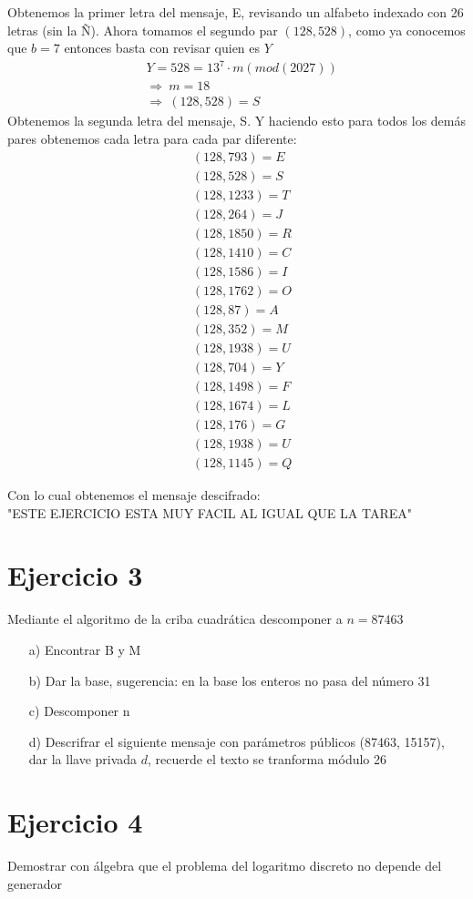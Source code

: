 \documentclass[12pt, letterpaper]{article}
\begin{document}
\begin{itemize}
Obtenemos la primer letra del mensaje, E, revisando un alfabeto indexado con 26 letras (sin la Ñ). Ahora tomamos el segundo par $(128, 528)$, como ya conocemos que $b = 7$ entonces basta con revisar quien es $Y$
\begin{equation*}
\begin{split}
&Y = 528 = 13^7\cdot m (mod (2027))\\
&\Rightarrow\ m = 18\\
&\Rightarrow\ (128, 528) = S
\end{split}
\end{equation*}
Obtenemos la segunda letra del mensaje, S. Y haciendo esto para todos los demás pares obtenemos cada letra para cada par diferente:
\begin{equation*}
\begin{split}
&(128, 793) = E\\
&(128, 528) = S\\
&(128, 1233) = T\\
&(128, 264) = J\\
&(128, 1850) = R\\
&(128, 1410) = C\\
&(128, 1586) = I\\
&(128, 1762) = O\\
&(128, 87) = A\\
&(128, 352) = M\\
&(128, 1938) = U\\
&(128, 704) = Y\\
&(128, 1498) = F\\
&(128, 1674) = L \\
&(128, 176) = G\\
&(128, 1938) = U\\
&(128, 1145) = Q
\end{split}
\end{equation*}

Con lo cual obtenemos el mensaje descifrado:\\

"ESTE EJERCICIO ESTA MUY FACIL AL IGUAL QUE LA TAREA"
\end{itemize}

\section*{Ejercicio 3}
Mediante el algoritmo de la criba cuadrática descomponer a $n = 87463$
\begin{itemize}
\item[a)] Encontrar B y M
\item[b)] Dar la base, sugerencia: en la base los enteros no pasa del número 31
\item[c)] Descomponer n
\item[d)] Descrifrar el siguiente mensaje con parámetros públicos (87463, 15157), dar la llave privada $d$, recuerde el texto se tranforma módulo 26
\end{itemize}

\section*{Ejercicio 4}
Demostrar con álgebra que el problema del logaritmo discreto no depende del generador
\end{document}
